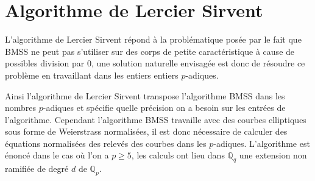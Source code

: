 \documentclass[10pt,a4paper]{book}
\theoremstyle{plain}
\theoremstyle{definition}
\theoremstyle{definition}
\theoremstyle{definition}
\theoremstyle{definition}
\theoremstyle{remark}
\theoremstyle{remark}
\begin{document}


\section{Algorithme de Lercier Sirvent}
L'algorithme de Lercier Sirvent répond à la problématique posée par le fait que BMSS ne peut pas s'utiliser sur des corps de petite caractéristique à cause de possibles division par $0$, une solution naturelle envisagée est donc de résoudre ce problème en travaillant dans les entiers entiers $p$-adiques.

Ainsi l'algorithme de Lercier Sirvent transpose l'algorithme BMSS dans les nombres $p$-adiques et spécifie quelle précision on a besoin sur les entrées de l'algorithme. Cependant l'algorithme  BMSS travaille avec des courbes elliptiques sous forme de Weierstrass normalisées, il est donc nécessaire de calculer des équations normalisées des relevés des courbes dans les $p$-adiques. L'algorithme est énoncé dans le cas où l'on a $p \geqslant 5$, les calculs ont lieu dans $\mathbb{Q}_q$ une extension non ramifiée de degré $d$ de $\mathbb{Q}_p$.
\end{document}
